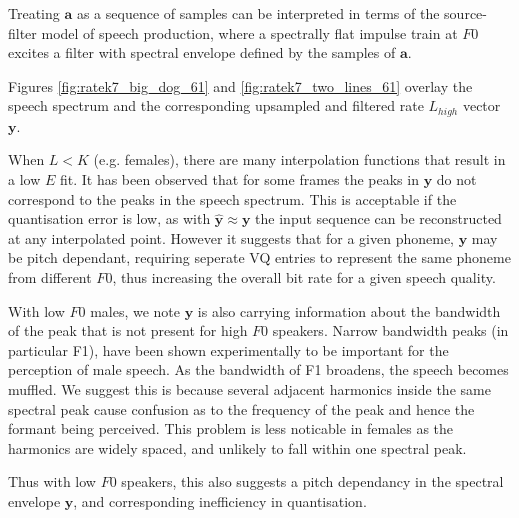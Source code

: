 \documentclass{article}
\begin{document}
Treating $\mathbf{a}$ as a sequence of samples can be interpreted in terms of the source-filter model of speech production, where a spectrally flat impulse train at $F0$ excites a filter with spectral envelope defined by the samples of $\mathbf{a}$.

Figures \ref{fig:ratek7_big_dog_61} and \ref{fig:ratek7_two_lines_61} overlay the speech spectrum and the corresponding upsampled and filtered rate $L_{high}$ vector $\mathbf{y}$.

When $L<K$ (e.g. females), there are many interpolation functions that result in a low $E$ fit.  It has been observed that for some frames the peaks in $\mathbf{y}$ do not correspond to the peaks in the speech spectrum.  This is acceptable if the quantisation error is low, as with $\hat{\mathbf{y}}\approx\mathbf{y}$ the input sequence can be reconstructed at any interpolated point.  However it suggests that for a given phoneme, $\mathbf{y}$ may be pitch dependant, requiring seperate VQ entries to represent the same phoneme from different $F0$, thus increasing the overall bit rate for a given speech quality.

With low $F0$ males, we note $\mathbf{y}$ is also carrying information about the bandwidth of the peak that is not present for high $F0$ speakers. Narrow bandwidth peaks (in particular F1), have been shown experimentally to be important for the perception of male speech.  As the bandwidth of F1 broadens, the speech becomes muffled.  We suggest this is because several adjacent harmonics inside the same spectral peak cause confusion as to the frequency of the peak and hence the formant being perceived.  This problem is less noticable in females as the harmonics are widely spaced, and unlikely to fall within one spectral peak.

Thus with low $F0$ speakers, this also suggests a pitch dependancy in the spectral envelope $\mathbf{y}$, and corresponding inefficiency in quantisation.
\end{document}
